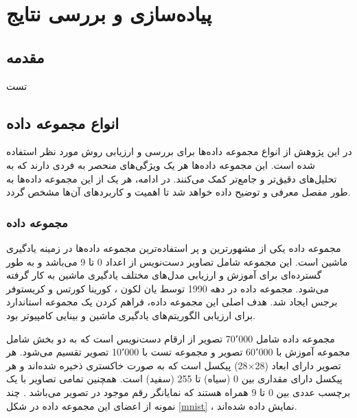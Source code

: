 \chapter{پیاده‌سازی و بررسی نتایج}

\section{مقدمه}
تست


\section{انواع مجموعه داده}
در این پژوهش از انواع مجموعه داده‌ها برای بررسی و ارزیابی روش مورد نظر استفاده شده است. این مجموعه داده‌ها هر یک ویژگی‌های منحصر به فردی دارند که به تحلیل‌های دقیق‌تر و جامع‌تر کمک می‌کنند. در ادامه، هر یک از این مجموعه داده‌ها به طور مفصل معرفی و توضیح داده خواهد شد تا اهمیت و کاربردهای آن‌ها مشخص گردد.

\subsection{
مجموعه داده
}
مجموعه داده
یکی از مشهورترین و پر استفاده‌ترین مجموعه داده‌ها در زمینه یادگیری ماشین است. این مجموعه شامل تصاویر دست‌نویس از اعداد 0 تا 9 می‌باشد و به طور گسترده‌ای برای آموزش و ارزیابی مدل‌های مختلف یادگیری ماشین به کار گرفته می‌شود.
مجموعه داده
در دهه 1990 توسط یان لکون%
،
کورینا کورتس%
و کریستوفر برجس%
 ایجاد شد. هدف اصلی این مجموعه داده، فراهم کردن یک مجموعه استاندارد برای ارزیابی الگوریتم‌های یادگیری ماشین و بینایی کامپیوتر بود.

مجموعه داده
شامل 70٬000 تصویر از ارقام دست‌نویس است که به دو بخش شامل مجموعه آموزش با 60٬000 تصویر و مجموعه تست با 10٬000 تصویر تقسیم می‌شود. هر تصویر دارای ابعاد
(28$\times$28)
پیکسل است که به صورت خاکستری%
ذخیره شده‌اند و هر پیکسل دارای مقداری بین 0 (سیاه) تا 255 (سفید) است. همچنین تمامی تصاویر با یک برچسب عددی بین 0 تا 9 همراه هستند که نمایانگر رقم موجود در تصویر می‌باشد
\cite{lecun1998gradient}.
چند نمونه از اعضای این مجموعه داده در شکل
\ref{mnist}%
، نمایش داده شده‌اند.

